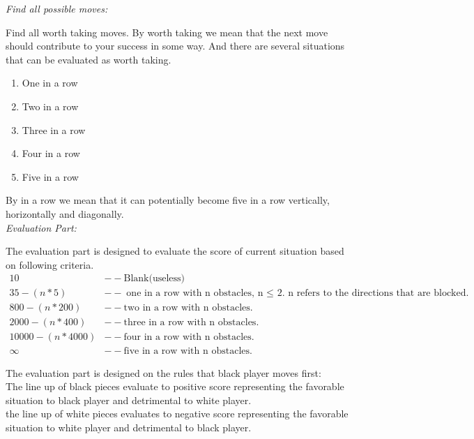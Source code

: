 \documentclass[fontsize=11pt]{article}
\begin{document}
\textbullet \hspace{2mm} \emph{Find all possible moves:}\par

Find all worth taking moves. By worth taking we mean that the next move should contribute to your success in some way. And there are several situations that can be evaluated as worth taking.\\

\begin{enumerate}[i]
    \item One in a row
    \item Two in a row
    \item Three in a row 
    \item Four in a row 
    \item Five in a row
\end{enumerate}
By in a row we mean that it can potentially become five in a row vertically, horizontally and diagonally.\\

\textbullet \hspace{2mm} \emph{Evaluation Part:}\par
The evaluation part is designed to evaluate the score of current situation based on following criteria.\\

\begin{align*}
10 &-- \text{Blank(useless)}\\
35 - (n * 5) &-- \text{one in a row with n obstacles, n $\leq$ 2. n refers to the directions that are blocked.}\\
800 - (n * 200) &-- \text{two in a row with n obstacles.}\\
2000 - (n * 400) &-- \text{three in a row with n obstacles.}\\
10000 - (n * 4000)& -- \text{four in a row with n obstacles.}\\
\infty & -- \text{five in a row with n obstacles.}
\end{align*}

The evaluation part is designed on the rules that black player moves first:\\

\textbullet \hspace{2mm} The line up of black pieces evaluate to positive score representing the favorable situation to black player and detrimental to white player.\\

\textbullet \hspace{2mm} the line up of white pieces evaluates to negative score representing the favorable situation to white player and detrimental to black player. \\
\end{document}
